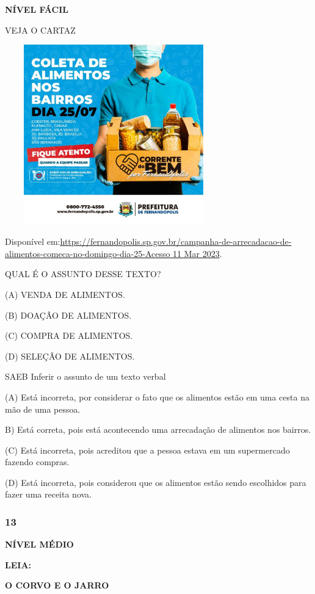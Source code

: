 \textbf{NÍVEL FÁCIL}

VEJA O CARTAZ

\includegraphics[width=3.71207in,height=3.06667in]{media/image171.jpeg}

Disponível
em:\href{https://fernandopolis.sp.gov.br/campanha-de-arrecadacao-de-alimentos-comeca-no-domingo-dia-25-Acesso\%2011\%20Mar\%202023}{https://fernandopolis.sp.gov.br/campanha-de-arrecadacao-de-alimentos-comeca-no-domingo-dia-25-Acesso
11 Mar 2023}.

QUAL É O ASSUNTO DESSE TEXTO?

(A) VENDA DE ALIMENTOS.

(B) DOAÇÃO DE ALIMENTOS.

(C) COMPRA DE ALIMENTOS.

(D) SELEÇÃO DE ALIMENTOS.

SAEB Inferir o assunto de um texto verbal

(A) Está incorreta, por considerar o fato que os alimentos estão em uma
cesta na mão de uma pessoa.

B) Está correta, pois está acontecendo uma arrecadação de alimentos nos
bairros.

(C) Está incorreta, pois acreditou que a pessoa estava em um
supermercado fazendo compras.

(D) Está incorreta, pois considerou que os alimentos estão sendo
escolhidos para fazer uma receita nova.

\subsubsection{13}\label{section-139}

\textbf{NÍVEL MÉDIO}

\textbf{LEIA:}

\textbf{O CORVO E O JARRO}

